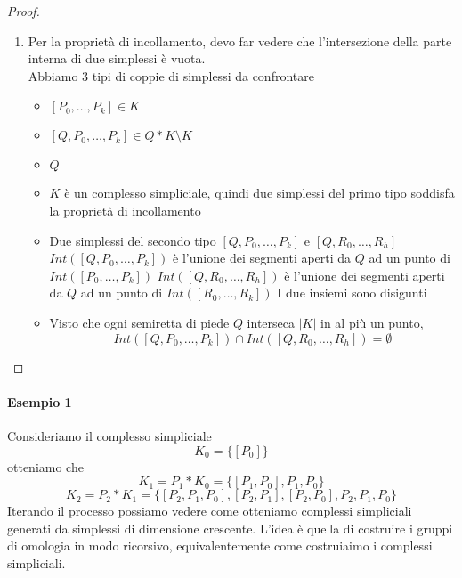 \documentclass[a4paper]{report}
\begin{document}
\begin{proof}
\begin{enumerate}
\begin{center}
\begin{tikzpicture}[x=0.75pt,y=0.75pt,yscale=-1,xscale=1]
                  \end{tikzpicture}

              \end{center}
        \item Per la proprietà di incollamento, devo far vedere che l'intersezione della parte interna di due simplessi è vuota.\\
              Abbiamo 3 tipi di coppie di simplessi da confrontare
              \begin{itemize}
                  \item $[P_0,\dots,P_k]\in K$
                  \item $[Q,P_0,\dots,P_k]\in Q*K\setminus K$
                  \item $Q$
              \end{itemize}
              \begin{itemize}
                  \item $K$ è un complesso simpliciale, quindi due simplessi del primo tipo soddisfa la proprietà di incollamento
                  \item Due simplessi del secondo tipo $[Q,P_0,\dots,P_k]$ e $[Q,R_0,\dots,R_h]$
                        \subitem $Int([Q,P_0,\dots,P_k])$ è l'unione dei segmenti aperti da $Q$ ad un punto di $Int([P_0,\dots,P_k])$
                        \subitem $Int([Q,R_0,\dots,R_h])$ è l'unione dei segmenti aperti da $Q$ ad un punto di $Int([R_0,\dots,R_k])$
                        I due insiemi sono disigunti
                  \item Visto che ogni semiretta di piede $Q$ interseca $|K|$ in al più un punto,
                        \[
                            Int([Q,P_0,\dots,P_k])\cap Int([Q,R_0,\dots,R_h])=\emptyset
                        \]
              \end{itemize}
    \end{enumerate}
\end{proof}
\paragraph{Esempio 1}
Consideriamo il complesso simpliciale
\[
    K_0=\{[P_0]\}
\]
otteniamo che
\[
    K_1=P_1*K_0=\{[P_1,P_0],P_1,P_0\}
\]
\[
    K_2=P_2*K_1=\{[P_2,P_1,P_0],[P_2,P_1],[P_2,P_0],P_2,P_1,P_0\}
\]
Iterando il processo possiamo vedere come otteniamo complessi simpliciali generati da simplessi di dimensione crescente. L'idea è quella di costruire i gruppi di omologia in modo ricorsivo, equivalentemente come costruiaimo i complessi simpliciali.
\end{document}

